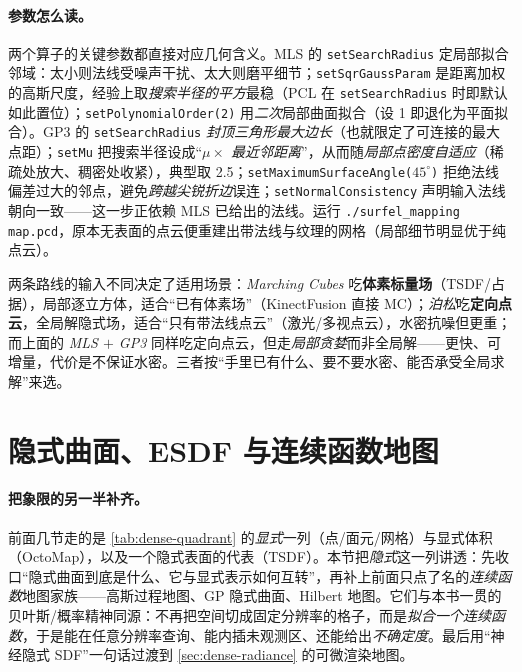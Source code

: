 \paragraph{参数怎么读。}
两个算子的关键参数都直接对应几何含义。MLS 的 \texttt{setSearchRadius} 定局部拟合邻域：太小则法线受噪声干扰、太大则磨平细节；\texttt{setSqrGaussParam} 是距离加权的高斯尺度，经验上取\emph{搜索半径的平方}最稳（PCL 在 \texttt{setSearchRadius} 时即默认如此置位）；\texttt{setPolynomialOrder(2)} 用\emph{二次}局部曲面拟合（设 1 即退化为平面拟合）。GP3 的 \texttt{setSearchRadius} \emph{封顶三角形最大边长}（也就限定了可连接的最大点距）；\texttt{setMu} 把搜索半径设成“\emph{$\mu\times$ 最近邻距离}”，从而随\emph{局部点密度自适应}（稀疏处放大、稠密处收紧），典型取 2.5；\texttt{setMaximumSurfaceAngle($45^\circ$)} 拒绝法线偏差过大的邻点，避免\emph{跨越尖锐折边}误连；\texttt{setNormalConsistency} 声明输入法线朝向一致——这一步正依赖 MLS 已给出的法线。运行 \texttt{./\allowbreak surfel\_mapping map.\allowbreak pcd}，原本无表面的点云便重建出带法线与纹理的网格（局部细节明显优于纯点云）。

\begin{insight}
两条路线的输入不同决定了适用场景：\emph{Marching Cubes} 吃\textbf{体素标量场}（TSDF/占据），局部逐立方体，适合“已有体素场”（KinectFusion 直接 MC）；\emph{泊松}吃\textbf{定向点云}，全局解隐式场，适合“只有带法线点云”（激光/多视点云），水密抗噪但更重；而上面的 \emph{MLS $+$ GP3} 同样吃定向点云，但走\emph{局部贪婪}而非全局解——更快、可增量，代价是不保证水密。三者按“手里已有什么、要不要水密、能否承受全局求解”来选。
\end{insight}

\section{隐式曲面、ESDF 与连续函数地图}
\label{sec:dense-implicit}

\paragraph{把象限的另一半补齐。}
前面几节走的是 \cref{tab:dense-quadrant} 的\emph{显式}一列（点/面元/网格）与显式体积（OctoMap），以及一个隐式表面的代表（TSDF）。本节把\emph{隐式}这一列讲透：先收口“隐式曲面到底是什么、它与显式表示如何互转”，再补上前面只点了名的\emph{连续函数}地图家族——高斯过程地图、GP 隐式曲面、Hilbert 地图。它们与本书一贯的贝叶斯/概率精神同源：不再把空间切成固定分辨率的格子，而是\emph{拟合一个连续函数}，于是能在任意分辨率查询、能内插未观测区、还能给出\emph{不确定度}。最后用“神经隐式 SDF”一句话过渡到 \cref{sec:dense-radiance} 的可微渲染地图。

